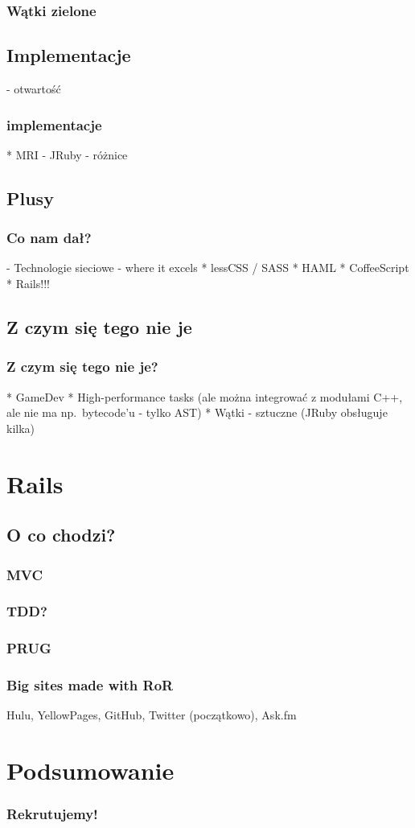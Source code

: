 \documentclass{beamer}
\begin{document}
\begin{frame}[fragile]
\frametitle{Wątki zielone}
\end{frame}
\subsection{Implementacje}
 - otwartość

\begin{frame}[fragile]
\frametitle{implementacje}
    * MRI
    - JRuby - różnice
\end{frame}



\subsection{Plusy}

\begin{frame}[fragile]
\frametitle{Co nam dał?}

- Technologie sieciowe - where it excels
* lessCSS / SASS
* HAML
* CoffeeScript
* Rails!!!
\end{frame}

\subsection{Z czym się tego nie je}

\begin{frame}[fragile]
\frametitle{Z czym się tego nie je?}
    * GameDev
    * High-performance tasks (ale można integrować z modułami C++, ale nie ma np.\ bytecode'u - tylko AST)
    * Wątki - sztuczne (JRuby obsługuje kilka)
\end{frame}

\section{Rails}
\subsection{O co chodzi?}
\begin{frame}[fragile]
\frametitle{MVC}

\end{frame}

\begin{frame}[fragile]
\frametitle{TDD?}
\end{frame}

\begin{frame}[fragile]
\frametitle{PRUG}
\end{frame}

\begin{frame}[fragile]
\frametitle{Big sites made with RoR}
Hulu, YellowPages, GitHub, Twitter (początkowo), Ask.fm
\end{frame}
\section{Podsumowanie}

\begin{frame}[fragile]
\frametitle{Rekrutujemy!}
\end{frame}
\end{document}

